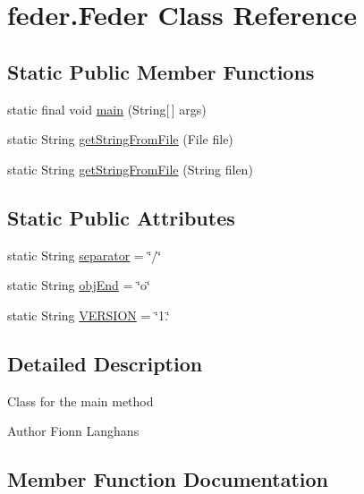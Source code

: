 \hypertarget{classfeder_1_1Feder}{}\section{feder.\+Feder Class Reference}
\label{classfeder_1_1Feder}
\subsection*{Static Public Member Functions}
\begin{DoxyCompactItemize}
\item 
static final void \hyperlink{classfeder_1_1Feder_a360b544d8dba874e9598deee40d365b9}{main} (String\mbox{[}$\,$\mbox{]} args)
\item 
static String \hyperlink{classfeder_1_1Feder_ab5b50219501cdb885408354548a54cef}{get\+String\+From\+File} (File file)
\item 
static String \hyperlink{classfeder_1_1Feder_aa2c0ca836770cd11575122b9295c6b9b}{get\+String\+From\+File} (String filen)
\end{DoxyCompactItemize}
\subsection*{Static Public Attributes}
\begin{DoxyCompactItemize}
\item 
static String \hyperlink{classfeder_1_1Feder_af14a275c06d1155a8cbe776cf7a156eb}{separator} = \char`\"{}/\char`\"{}
\item 
static String \hyperlink{classfeder_1_1Feder_a456aa8c75c4f593438f11c8bfccbc030}{obj\+End} = \char`\"{}o\char`\"{}
\item 
static String \hyperlink{classfeder_1_1Feder_a7d76dfb8e1cf17ae7b8183c4f0e9c303}{V\+E\+R\+S\+I\+ON} = \char`\"{}1.\char`\"{}
\end{DoxyCompactItemize}


\subsection{Detailed Description}
Class for the main method

\begin{DoxyAuthor}{Author}
Fionn Langhans 
\end{DoxyAuthor}


\subsection{Member Function Documentation}
\mbox{\label{classfeder_1_1Feder_ab5b50219501cdb885408354548a54cef}} 
